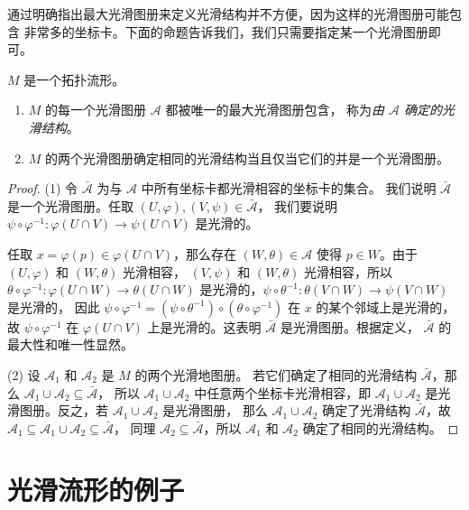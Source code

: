 通过明确指出最大光滑图册来定义光滑结构并不方便，因为这样的光滑图册可能包含
非常多的坐标卡。下面的命题告诉我们，我们只需要指定某一个光滑图册即可。

\begin{proposition}
  $M$ 是一个拓扑流形。
  \begin{enumerate}
    \item $M$ 的每一个光滑图册 $\mathcal{A}$ 都被唯一的最大光滑图册包含，
    称为\emph{由 $\mathcal{A}$ 确定的光滑结构}。
    \item $M$ 的两个光滑图册确定相同的光滑结构当且仅当它们的并是一个光滑图册。
  \end{enumerate}
\end{proposition}
\begin{proof}
  (1) 令 $\bar{\mathcal{A}}$ 为与 $\mathcal{A}$ 中所有坐标卡都光滑相容的坐标卡的集合。
  我们说明 $\bar{\mathcal{A}}$ 是一个光滑图册。任取 $(U,\varphi),(V,\psi)\in \bar{\mathcal{A}}$，
  我们要说明 $\psi\circ\varphi^{-1}:\varphi(U\cap V)\to\psi(U\cap V)$ 是光滑的。

  任取 $x=\varphi(p)\in\varphi(U\cap V)$，那么存在 $(W,\theta)\in\mathcal{A}$ 
  使得 $p\in W$。由于 $(U,\varphi)$ 和 $(W,\theta)$ 光滑相容，
  $(V,\psi)$ 和 $(W,\theta)$ 光滑相容，所以 $\theta\circ\varphi^{-1}:\varphi(U\cap W)\to\theta(U\cap W)$
  是光滑的，$\psi\circ\theta^{-1}:\theta(V\cap W)\to\psi(V\cap W)$ 是光滑的，
  因此 $\psi\circ\varphi^{-1}=(\psi\circ\theta^{-1})\circ(\theta\circ\varphi^{-1})$
  在 $x$ 的某个邻域上是光滑的，故 $\psi\circ\varphi^{-1}$ 在 $\varphi(U\cap V)$
  上是光滑的。这表明 $\bar{\mathcal{A}}$ 是光滑图册。根据定义，
  $\bar{\mathcal{A}}$ 的最大性和唯一性显然。

  (2) 设 $\mathcal{A}_1$ 和 $\mathcal{A}_2$ 是 $M$ 的两个光滑地图册。
  若它们确定了相同的光滑结构 $\bar{\mathcal{A}}$，那么 $\mathcal{A}_1\cup\mathcal{A}_2\subseteq\bar{\mathcal{A}}$，
  所以 $\mathcal{A}_1\cup\mathcal{A}_2$ 中任意两个坐标卡光滑相容，即 $\mathcal{A}_1\cup\mathcal{A}_2$
  是光滑图册。反之，若 $\mathcal{A}_1\cup\mathcal{A}_2$ 是光滑图册，
  那么 $\mathcal{A}_1\cup\mathcal{A}_2$ 确定了光滑结构 $\bar{\mathcal{A}}$，故
  $\mathcal{A}_1\subseteq\mathcal{A}_1\cup\mathcal{A}_2\subseteq\bar{\mathcal{A}}$，
  同理 $\mathcal{A}_2\subseteq\bar{\mathcal{A}}$，所以 $\mathcal{A}_1$ 和 $\mathcal{A}_2$
  确定了相同的光滑结构。
\end{proof}


\section{光滑流形的例子}

